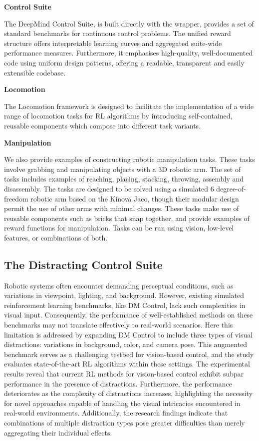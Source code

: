 \begin{description}
\item{\textbf{Control Suite}}

The DeepMind \textsf{Control Suite}, is built directly with the \mujoco wrapper, provides a set of standard benchmarks for continuous control problems. The unified reward structure offers interpretable learning curves and aggregated suite-wide performance measures. Furthermore, it emphasises high-quality, well-documented code using uniform design patterns, offering a readable, transparent and easily extensible codebase.
%
\item{\textbf{Locomotion}}

The Locomotion framework is designed to facilitate the implementation of a wide range of locomotion tasks for RL algorithms by introducing self-contained, reusable components which compose into different task variants. 
%
\item{\textbf{Manipulation}}

We also provide examples of constructing robotic manipulation tasks. These tasks involve grabbing and manipulating objects with a 3D robotic arm. The set of tasks includes examples of reaching, placing, stacking, throwing, assembly and disassembly.
The tasks are designed to be solved using a simulated 6 degree-of-freedom robotic arm based on the Kinova Jaco, though their modular design permit the use of other arms with minimal changes. 
These tasks make use of reusable components such as bricks that snap together, and provide examples of reward functions for manipulation.
Tasks can be run using vision, low-level features, or combinations of both.

\end{description}

\newpage
\subsection{The Distracting Control Suite\cite{stone2021distracting}}
Robotic systems often encounter demanding perceptual conditions, such as variations in viewpoint, lighting, and background. However, existing simulated reinforcement learning benchmarks, like DM Control, lack such complexities in visual input. Consequently, the performance of well-established methods on these benchmarks may not translate effectively to real-world scenarios. Here this limitation is addressed by expanding DM Control to include three types of visual distractions: variations in background, color, and camera pose. This augmented benchmark serves as a challenging testbed for vision-based control, and the study evaluates state-of-the-art RL algorithms within these settings. The experimental results reveal that current RL methods for vision-based control exhibit subpar performance in the presence of distractions. Furthermore, the performance deteriorates as the complexity of distractions increases, highlighting the necessity for novel approaches capable of handling the visual intricacies encountered in real-world environments. Additionally, the research findings indicate that combinations of multiple distraction types pose greater difficulties than merely aggregating their individual effects.

